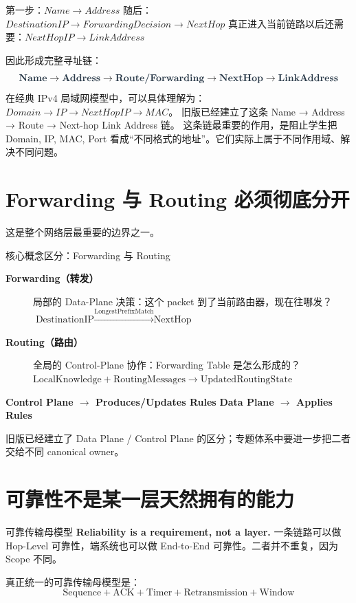 \documentclass[11pt,a4paper,openany]{ctexbook}
\newcommand{\key}[1]{\textbf{\color{deep}#1}}
\begin{document}
第一步：$Name \rightarrow Address$\newline
随后：$DestinationIP \rightarrow ForwardingDecision \rightarrow NextHop$\newline
真正进入当前链路以后还需要：$NextHopIP \rightarrow LinkAddress$

因此形成完整寻址链：
\[
\key{Name} \rightarrow \key{Address} \rightarrow \key{Route/Forwarding} \rightarrow \key{NextHop} \rightarrow \key{LinkAddress}
\]
在经典 IPv4 局域网模型中，可以具体理解为：$Domain \rightarrow IP \rightarrow NextHopIP \rightarrow MAC$。
旧版已经建立了这条 Name → Address → Route → Next-hop Link Address 链。
这条链最重要的作用，是阻止学生把 Domain, IP, MAC, Port 看成“不同格式的地址”。它们实际上属于不同作用域、解决不同问题。

\section{Forwarding 与 Routing 必须彻底分开}
这是整个网络层最重要的边界之一。

\begin{methodbox}{核心概念区分：Forwarding 与 Routing}
\begin{description}
    \item[\key{Forwarding（转发）}] 局部的 Data-Plane 决策：这个 packet 到了当前路由器，现在往哪发？\newline
    $\text{DestinationIP} \xrightarrow{\text{LongestPrefixMatch}} \text{NextHop}$
    \item[\key{Routing（路由）}] 全局的 Control-Plane 协作：Forwarding Table 是怎么形成的？\newline
    $\text{LocalKnowledge} + \text{RoutingMessages} \rightarrow \text{UpdatedRoutingState}$
\end{description}
\tcblower
\begin{center}
\key{Control Plane $\rightarrow$ Produces/Updates Rules} \qquad \key{Data Plane $\rightarrow$ Applies Rules}
\end{center}
\end{methodbox}
旧版已经建立了 Data Plane / Control Plane 的区分；专题体系中要进一步把二者交给不同 canonical owner。

\section{可靠性不是某一层天然拥有的能力}
\begin{corebox}{可靠传输母模型}
\textbf{Reliability is a requirement, not a layer.} 一条链路可以做 Hop-Level 可靠性，端系统也可以做 End-to-End 可靠性。二者并不重复，因为 Scope 不同。

真正统一的可靠传输母模型是：
\[
\text{Sequence} + \text{ACK} + \text{Timer} + \text{Retransmission} + \text{Window}
\]
\end{corebox}
\end{document}
